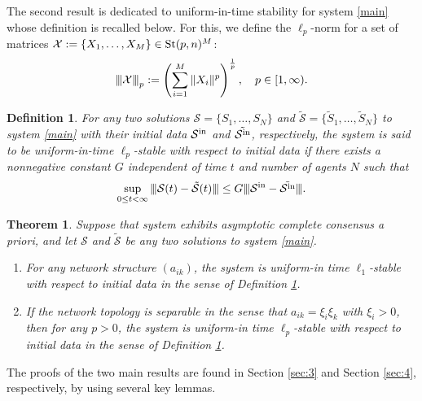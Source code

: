 \documentclass[11pt,reqno]{amsart}
\numberwithin{figure}{section}
\newcommand{\opnorm}[1]{{ \vert\kern-0.25ex \vert\kern-0.25ex \vert #1 
     \vert\kern-0.25ex \vert\kern-0.25ex \vert}}
\newcommand{\St}{  {\textup{St}}(p,n) }
\newcommand{\init}{  {\textup{in}} }
\newtheorem{theorem}{Theorem}[section]
\newtheorem{definition}{Definition}[section]
\begin{document}
The second result is dedicated to uniform-in-time stability for system \eqref{main} whose definition is recalled below. For this, we  define the $\ell_p$-norm for  a set of matrices $\mathcal X: = \{X_1,\ldots,X_M\} \in \St^M$:
\[
\opnorm{\mathcal X}_p:= \left( \sum_{i=1}^M \|X_i\|^p \right)^\frac1p,\quad p\in [1,\infty).
\]
\begin{definition} \label{D1.2} 
For any two solutions $\mathcal S = \{S_1,\ldots,S_N\}$ and $\tilde{ \mathcal S }= \{\tilde S_1,\ldots,\tilde S_N\}$ to system \eqref{main} with their initial data $\mathcal S^\init$ and $\tilde{\mathcal S^\init}$, respectively, the system is said to be uniform-in-time  $\ell_p$-stable with respect to initial data if there exists a nonnegative constant $G$ independent of time $t$ and number of agents $N$ such that
\[
\sup_{0\leq t<\infty} \opnorm{ \mathcal S(t)  - \tilde {\mathcal S}(t)  } \leq G \opnorm{ \mathcal S^\init - \tilde {\mathcal S^\init} } .
\]
\end{definition}




 


\begin{theorem} \label{T1.2} 
Suppose that system exhibits asymptotic complete consensus a priori, and let $\mathcal S$ and $\tilde{\mathcal S}$ be any two solutions to system \eqref{main}. 
\begin{enumerate}
\item For any  network structure $(a_{ik})$, the system  is uniform-in time $\ell_1$-stable with respect to initial data in the sense of Definition \ref{D1.2}. 
\item If the network topology is separable in the sense that $a_{ik} = \xi_i\xi_k$ with $\xi_i>0$, then for any $p>0$, the system  is uniform-in time $\ell_p$-stable with respect to initial data in the sense of Definition \ref{D1.2}. 
\end{enumerate}
\end{theorem}

The proofs of the two main results are found in Section \ref{sec:3} and Section \ref{sec:4}, respectively, by using several key lemmas.  %
\end{document}
